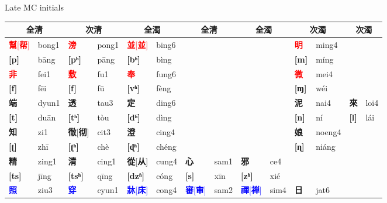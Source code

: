 \documentclass{beamer}
\begin{document}
\begin{frame}[fragile]{Late MC initials}

\begin{adjustwidth}{-1.5em}{-1.5em}
\begin{table}
        \flushleft
        {\scriptsize
        \setlength{\tabcolsep}{1pt}
        \renewcommand{\arraystretch}{1.2}
        \begin{tabular}{l l | l l | l l | l l | l l | l l | l l}
            \hline
            \multicolumn{2}{c}{全清} & \multicolumn{2}{c}{次清} & \multicolumn{2}{c}{全濁} & \multicolumn{2}{c}{全清} & \multicolumn{2}{c}{全濁} & \multicolumn{2}{c}{次濁} & \multicolumn{2}{c}{次濁}\\
            \hline
            \textcolor{red}{\textbf{幫}[\textbf{帮}]} & bong1 & \textcolor{red}{\textbf{滂}} & pong1 & \textcolor{red}{\textbf{並}[\textbf{並}]} & bing6 & & & & & \textcolor{red}{\textbf{明}} & ming4 & & \\
            \textbf{[p]}& bāng & \textbf{[pʰ]}& pāng & \textbf{[bʱ]}& bìng & & & & & \textbf{[m]}& míng & & \\ \hline
            \textcolor{red}{\textbf{非}} & fei1 & \textcolor{red}{\textbf{敷}} & fu1 & \textcolor{red}{\textbf{奉}} & fung6 & & & & & \textcolor{red}{\textbf{微}} & mei4 & & \\
            \textbf{[f]}& fēi & \textbf{[f]}& fū & \textbf{[vʱ]}& fèng & & & & & \textbf{[ɱ]}& wéi & & \\ \hline
            \textbf{端} & dyun1 & \textbf{透} & tau3 & \textbf{定} & ding6 & & & & & \textbf{泥} & nai4 & \textbf{來} & loi4\\
            \textbf{[t]} & duān & \textbf{[tʰ]} & tòu & \textbf{[dʱ]} & dìng & & & & & \textbf{[n]} & ní & \textbf{[l]} & lái \\ \hline
            \textbf{知} & zi1 & \textbf{徹}[\textbf{彻}] & cit3 & \textbf{澄} & cing4 & & & & & \textbf{娘} & noeng4 & & \\
            \textbf{[ʈ]} & zhī & \textbf{[ʈʰ]} & chè & \textbf{[ɖʱ]} & chéng & & & & & \textbf{[ɳ]} & niáng & & \\ \hline
            \textbf{精} & zing1 & \textbf{清} & cing1 & \textbf{從}[\textbf{从}] & cung4 & \textbf{心} & sam1 & \textbf{邪} & ce4 & & & & \\
            \textbf{[ts]} & jīng & \textbf{[tsʰ]} & qīng & \textbf{[dzʱ]} & cóng & \textbf{[s]} & xīn & \textbf{[zʱ]} & xié & & & & \\ \hline
              \textcolor{blue}{\textbf{照}} & ziu3 & \textcolor{blue}{\textbf{穿}} & cyun1 & \textcolor{blue}{\textbf{牀}[\textbf{床}]} & cong4 & \textcolor{blue}{\textbf{審}[\textbf{审}]} & sam2 & \textcolor{blue}{\textbf{禪}[\textbf{禅}]} & sim4 & \textbf{日} & jat6 & & \\

\end{tabular}}
\end{table}
\end{adjustwidth}
\end{frame}
\end{document}
